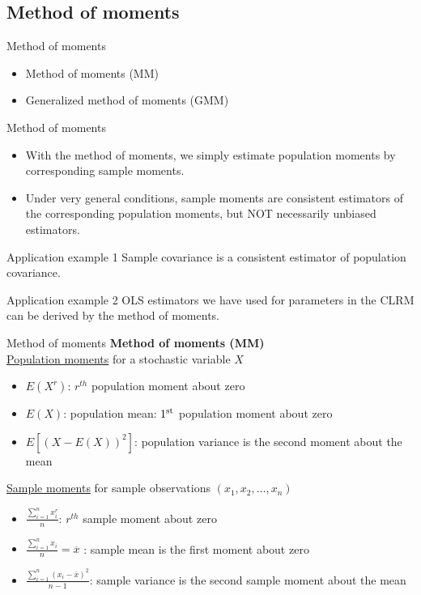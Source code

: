 \documentclass{beamer}
\begin{document}
\subsection{Method of moments}
\begin{frame}{Method of moments}
\begin{itemize}
    \item Method of moments (MM)
    \bigskip
    \item Generalized method of moments (GMM)
\end{itemize} 
\end{frame}
\begin{frame}{Method of moments}

\begin{itemize}
\item With the method of moments, we simply estimate population moments by corresponding sample moments. 
\medskip
\item Under very general conditions, sample moments are consistent estimators of the corresponding population moments, but NOT necessarily unbiased estimators.
\end{itemize}
\begin{block}{Application example 1}
Sample covariance is a consistent estimator of population covariance.
\end{block}
\begin{block}{Application example 2}
OLS estimators we have used for parameters in the CLRM can be derived by the method of moments. 
\end{block}
\end{frame}
\begin{frame}{Method of moments}
\small 
\textbf{Method of moments (MM)}\\
\smallskip
\underline{Population moments} for a stochastic variable $X$\\
\begin{itemize}
\item $E(X^r)$: $r^{th}$ population moment about zero
\item $E(X)$: population mean: $1^{\textnormal{st}}$ population moment about zero
\item $E[(X-E(X))^2]$: population variance is the second moment about the mean
\end{itemize}
\medskip
\underline{Sample moments} for sample observations $(x_1, x_2, \dots,x_n)$
\begin{itemize}
\item $\frac{\sum_{i=1}^n x^r_i}{n}$: $r^{th}$ sample moment about zero
\item $\frac{\sum_{i=1}^n x_i}{n}=\overline{x} $ : sample mean is the first moment about zero
\item $\frac{\sum_{i=1}^n (x_i-\overline{x})^2}{n-1}$: sample variance is the second sample moment about the mean
\end{itemize}
\end{frame}
\end{document}
